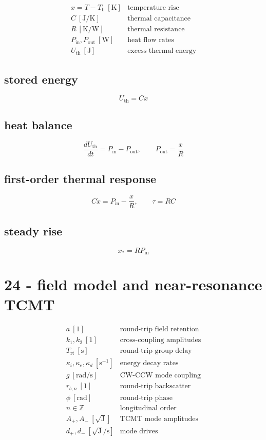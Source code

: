 \[
\begin{array}{ll}x=T-T_{\mathrm b}\ [\mathrm K]&\text{temperature rise}\\[0.6em]C\ [\mathrm{J/K}]&\text{thermal capacitance}\\[0.6em]R\ [\mathrm{K/W}]&\text{thermal resistance}\\[0.6em]P_{\mathrm{in}},P_{\mathrm{out}}\ [\mathrm W]&\text{heat flow rates}\\[0.6em]U_{\mathrm{th}}\ [\mathrm J]&\text{excess thermal energy}\end{array}
\]

\subsection*{stored energy}
\[
\displaystyle U_{\mathrm{th}}=Cx
\]

\subsection*{heat balance}
\[
\displaystyle \frac{dU_{\mathrm{th}}}{dt}=P_{\mathrm{in}}-P_{\mathrm{out}},\qquad P_{\mathrm{out}}=\frac xR
\]

\subsection*{first-order thermal response}
\[
\displaystyle C\dot x=P_{\mathrm{in}}-\frac xR,\qquad\tau=RC
\]

\subsection*{steady rise}
\[
\displaystyle x_*=RP_{\mathrm{in}}
\]

\clearpage
\section*{24 - field model and near-resonance TCMT}

\[
\begin{array}{ll}a\ [1]&\text{round-trip field retention}\\[0.6em]k_1,k_2\ [1]&\text{cross-coupling amplitudes}\\[0.6em]T_{\mathrm{rt}}\ [\mathrm s]&\text{round-trip group delay}\\[0.6em]\kappa_i,\kappa_e,\kappa_d\ [\mathrm{s}^{-1}]&\text{energy decay rates}\\[0.6em]g\ [\mathrm{rad/s}]&\text{CW-CCW mode coupling}\\[0.6em]r_{b,n}\ [1]&\text{round-trip backscatter}\\[0.6em]\phi\ [\mathrm{rad}]&\text{round-trip phase}\\[0.6em]n\in\mathbb Z&\text{longitudinal order}\\[0.6em]A_+,A_-\ [\sqrt{\mathrm J}]&\text{TCMT mode amplitudes}\\[0.6em]d_+,d_-\ [\sqrt{\mathrm J}/\mathrm s]&\text{mode drives}\end{array}
\]

